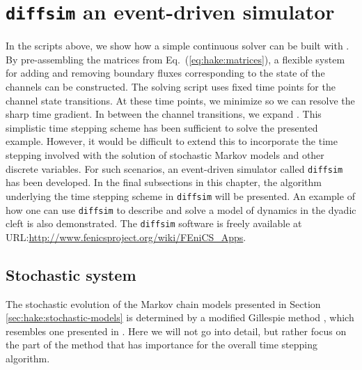 \section{\texttt{diffsim} an event-driven simulator}
\label{sec:hake:diffsim}
   In
the \pydolfin scripts above, we show how a simple continuous solver
can be built with \pydolfin. By pre-assembling the matrices from
Eq.~(\ref{eq:hake:matrices}), a flexible system for adding and
removing boundary fluxes corresponding to the state of the channels
can be constructed. The solving script uses fixed time points for the
channel state transitions. At these time points, we minimize \Dt so we
can resolve the sharp time gradient. In between the channel
transitions, we expand \Dt. This simplistic time stepping scheme has
been sufficient to solve the presented example. However, it would be
difficult to extend this to incorporate the time stepping involved
with the solution of stochastic Markov models and other discrete
variables. For such scenarios, an event-driven simulator called
\texttt{diffsim} has been developed. In the final subsections in this
chapter, the algorithm underlying the time stepping scheme in
\texttt{diffsim} will be presented. An example of how one can use
\texttt{diffsim} to describe and solve a model of \Ca dynamics in the
dyadic cleft is also demonstrated. The \texttt{diffsim} software is
freely available at
URL:\url{http://www.fenicsproject.org/wiki/FEniCS_Apps}.

\subsection{Stochastic system}

\label{sec:hake:stochastic-system}
    The stochastic evolution of the
Markov chain models presented in Section
\ref{sec:hake:stochastic-models} is determined by a modified Gillespie
method \citep{Gillespie1977}, which resembles one presented in
\citet{RudigerShuaiHuisingaEtAl2007}. Here we will not go into detail,
but rather focus on the part of the method that has importance for the
overall time stepping algorithm.

